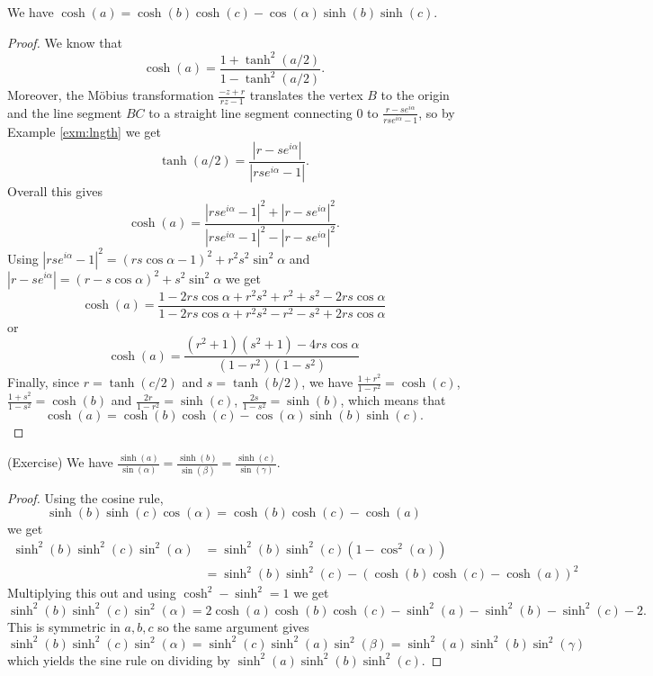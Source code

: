 \documentclass[12pt]{article}
\begin{document}
\begin{lma}
  We have $\cosh(a)=\cosh(b)\cosh(c)-\cos(\alpha)\sinh(b)\sinh(c)$.
\end{lma}
\begin{proof}
  We know that
  \[\cosh(a)=\frac{1+\tanh^2(a/2)}{1-\tanh^2(a/2)}.\]
  Moreover, the M\"obius transformation $\frac{-z+r}{rz-1}$ translates the vertex $B$ to the origin and the line segment $BC$ to a straight line segment connecting 0 to $\frac{r-se^{i\alpha}}{rse^{i\alpha}-1}$, so by Example \ref{exm:lngth} we get
  \[\tanh(a/2)=\frac{|r-se^{i\alpha}|}{|rse^{i\alpha}-1|}.\]
  Overall this gives
  \[\cosh(a)=\frac{|rse^{i\alpha}-1|^2+|r-se^{i\alpha}|^2}{|rse^{i\alpha}-1|^2-|r-se^{i\alpha}|^2}.\]
  Using $|rse^{i\alpha}-1|^2=(rs\cos\alpha-1)^2+r^2s^2\sin^2\alpha$ and $|r-se^{i\alpha}|=(r-s\cos\alpha)^2+s^2\sin^2\alpha$ we get
  \[\cosh(a)=\frac{1-2rs\cos\alpha+r^2s^2+r^2+s^2-2rs\cos\alpha}{1-2rs\cos\alpha+r^2s^2-r^2-s^2+2rs\cos\alpha}\]
  or
  \[\cosh(a)=\frac{(r^2+1)(s^2+1)-4rs\cos\alpha}{(1-r^2)(1-s^2)}\]
  Finally, since $r=\tanh(c/2)$ and $s=\tanh(b/2)$, we have $\frac{1+r^2}{1-r^2}=\cosh(c)$, $\frac{1+s^2}{1-s^2}=\cosh(b)$ and $\frac{2r}{1-r^2}=\sinh(c)$, $\frac{2s}{1-s^2}=\sinh(b)$, which means that
  \[\cosh(a)=\cosh(b)\cosh(c)-\cos(\alpha)\sinh(b)\sinh(c).\]
\end{proof}	  

\begin{lma}
  (Exercise) We have $\frac{\sinh(a)}{\sin(\alpha)}=\frac{\sinh(b)}{\sin(\beta)}=\frac{\sinh(c)}{\sin(\gamma)}$.
\end{lma}
\begin{proof}
  Using the cosine rule,
  \[\sinh(b)\sinh(c)\cos(\alpha)=\cosh(b)\cosh(c)-\cosh(a)\]
  we get
  \begin{align*}
    \sinh^2(b)\sinh^2(c)\sin^2(\alpha)&=\sinh^2(b)\sinh^2(c)(1-\cos^2(\alpha))\\
    &=\sinh^2(b)\sinh^2(c)-(\cosh(b)\cosh(c)-\cosh(a))^2
  \end{align*}
  Multiplying this out and using $\cosh^2-\sinh^2=1$ we get
  \[\sinh^2(b)\sinh^2(c)\sin^2(\alpha)=2\cosh(a)\cosh(b)\cosh(c)-\sinh^2(a)-\sinh^2(b)-\sinh^2(c)-2.\]
  This is symmetric in $a,b,c$ so the same argument gives
  \[\sinh^2(b)\sinh^2(c)\sin^2(\alpha)=\sinh^2(c)\sinh^2(a)\sin^2(\beta)=\sinh^2(a)\sinh^2(b)\sin^2(\gamma)\]
  which yields the sine rule on dividing by $\sinh^2(a)\sinh^2(b)\sinh^2(c)$.
\end{proof}	  
\end{document}
